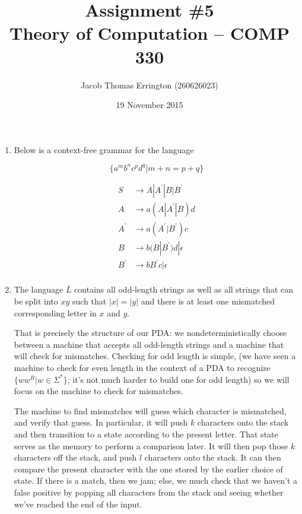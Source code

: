 \documentclass[letterpaper,11pt]{article}
\author{Jacob Thomas Errington (260626023)}
\title{Assignment \#5\\Theory of Computation -- COMP 330}
\date{19 November 2015}
\begin{document}
\maketitle

\begin{enumerate}
    \item
        Below is a context-free grammar for the language

        $$
        \{a^m b^n c^p d^q | m + n = p + q\}
        $$

        \begin{align*}
            S &\to A | A^\prime | B | B^\prime \\
            A &\to a (A | A^\prime | B) d \\
            A^\prime &\to a (A^\prime | B^\prime) c \\
            B &\to b (B | B^\prime) d | \epsilon \\
            B^\prime &\to b B^\prime c | \epsilon \\
        \end{align*}

    \item
        The language $\bar L$ contains all odd-length strings as well as all
        strings that can be split into $xy$ such that $|x| = |y|$ and there is
        at least one mismatched corresponding letter in $x$ and $y$.

        That is precisely the structure of our PDA: we nondeterministically
        choose between a machine that accepts all odd-length strings and a
        machine that will check for mismatches. Checking for odd length is
        simple, (we have seen a machine to check for even length in the context
        of a PDA to recognize $\{ ww^R | w \in \Sigma^*\}$; it's not much
        harder to build one for odd length) so we will focus on the machine to
        check for mismatches.

        The machine to find mismatches will guess which character is
        mismatched, and verify that guess. In particular, it will push $k$
        characters onto the stack and then transition to a state according to
        the present letter. That state serves as the memory to perform a
        comparison later. It will then pop those $k$ characters off the stack,
        and push $l$ characters onto the stack. It can then compare the present
        character with the one stored by the earlier choice of state. If there
        is a match, then we jam; else, we much check that we haven't a false
        positive by popping all characters from the stack and seeing whether
        we've reached the end of the input.


\end{enumerate}
\end{document}
